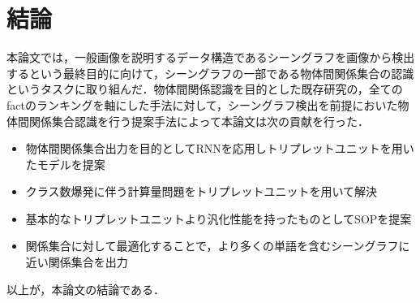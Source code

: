 \section{結論}

本論文では，一般画像を説明するデータ構造であるシーングラフ\cite{Johnson}を画像から検出するという最終目的に向けて，シーングラフの一部である物体間関係集合の認識というタスクに取り組んだ．物体間関係認識を目的とした既存研究の，全てのfactのランキングを軸にした手法に対して，シーングラフ検出を前提においた物体間関係集合認識を行う提案手法によって本論文は次の貢献を行った．

	\begin{itemize}
		\item 物体間関係集合出力を目的としてRNNを応用しトリプレットユニットを用いたモデルを提案
		\item クラス数爆発に伴う計算量問題をトリプレットユニットを用いて解決
		\item 基本的なトリプレットユニットより汎化性能を持ったものとしてSOPを提案
		\item 関係集合に対して最適化することで，より多くの単語を含むシーングラフに近い関係集合を出力
	\end{itemize}

以上が，本論文の結論である．






